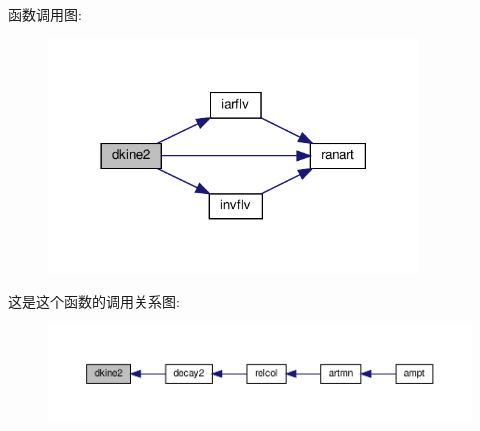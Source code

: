 函数调用图\+:
\nopagebreak
\begin{figure}[H]
\begin{center}
\leavevmode
\includegraphics[width=278pt]{dkine2_8f90_a32addcfaa82263d323656702c1ef4629_cgraph}
\end{center}
\end{figure}
这是这个函数的调用关系图\+:
\nopagebreak
\begin{figure}[H]
\begin{center}
\leavevmode
\includegraphics[width=350pt]{dkine2_8f90_a32addcfaa82263d323656702c1ef4629_icgraph}
\end{center}
\end{figure}
